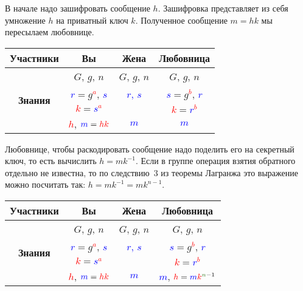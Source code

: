 В начале надо зашифровать сообщение $h$. Зашифровка представляет из себя умножение $h$ на приватный ключ $k$. Полученное сообщение $m = hk$ мы пересылаем любовнице.
\begin{center}
\begin{tabular}{|c|c|c|c|}
\hline
{\bf Участники}&{Вы}&{Жена}&{Любовница}\\
\hline
\multirow{4}{*}{\bf Знания}&{\textcolor{OliveGreen}{$G$}, \textcolor{OliveGreen}{$g$}, \textcolor{OliveGreen}{$n$}}&{\textcolor{OliveGreen}{$G$}, \textcolor{OliveGreen}{$g$}, \textcolor{OliveGreen}{$n$}}&{\textcolor{OliveGreen}{$G$}, \textcolor{OliveGreen}{$g$}, \textcolor{OliveGreen}{$n$}}\\
{}&{ \textcolor{blue}{$r$}$=$\textcolor{OliveGreen}{$ g$}\textcolor{red}{${}^a$}, \textcolor{blue}{$s$}}&{\textcolor{blue}{$r$, $s$}}&{ \textcolor{blue}{$s$}$=$\textcolor{OliveGreen}{$g$}\textcolor{red}{${}^b$}, \textcolor{blue}{$r$}}\\
{}&{ \textcolor{red}{$k$}$=$\textcolor{blue}{$s$}\textcolor{red}{${}^a$}}&{}&{ \textcolor{red}{$k$}$=$\textcolor{blue}{$r$}\textcolor{red}{${}^b$}}\\
{}&{\textcolor{red}{$h$}, $\textcolor{blue}{m} = \textcolor{red}{hk}$}&{\textcolor{blue}{$m$}}&{\textcolor{blue}{$m$}}\\
\hline
\end{tabular}
\end{center}

Любовнице, чтобы раскодировать сообщение надо поделить его на секретный ключ, то есть вычислить $h = m k^{-1}$. Если в группе операция взятия обратного отдельно не известна, то по следствию~3 из теоремы Лагранжа это выражение можно посчитать так: $h = m k^{-1} = m k^{n - 1}$.
\begin{center}
\begin{tabular}{|c|c|c|c|}
\hline
{\bf Участники}&{Вы}&{Жена}&{Любовница}\\
\hline
\multirow{4}{*}{\bf Знания}&{\textcolor{OliveGreen}{$G$}, \textcolor{OliveGreen}{$g$}, \textcolor{OliveGreen}{$n$}}&{\textcolor{OliveGreen}{$G$}, \textcolor{OliveGreen}{$g$}, \textcolor{OliveGreen}{$n$}}&{\textcolor{OliveGreen}{$G$}, \textcolor{OliveGreen}{$g$}, \textcolor{OliveGreen}{$n$}}\\
{}&{ \textcolor{blue}{$r$}$=$\textcolor{OliveGreen}{$ g$}\textcolor{red}{${}^a$}, \textcolor{blue}{$s$}}&{\textcolor{blue}{$r$, $s$}}&{ \textcolor{blue}{$s$}$=$\textcolor{OliveGreen}{$g$}\textcolor{red}{${}^b$}, \textcolor{blue}{$r$}}\\
{}&{ \textcolor{red}{$k$}$=$\textcolor{blue}{$s$}\textcolor{red}{${}^a$}}&{}&{ \textcolor{red}{$k$}$=$\textcolor{blue}{$r$}\textcolor{red}{${}^b$}}\\
{}&{\textcolor{red}{$h$}, $\textcolor{blue}{m} = \textcolor{red}{hk}$}&{\textcolor{blue}{$m$}}&{\textcolor{blue}{$m$}, $\textcolor{red}{h} = \textcolor{blue}{m} \textcolor{red}{k}^{\textcolor{OliveGreen}{n}-1}$}\\
\hline
\end{tabular}
\end{center}

